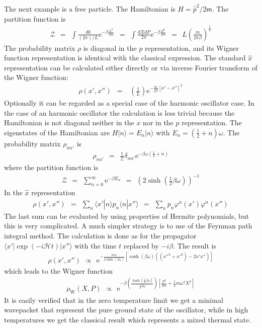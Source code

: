 \documentclass[onecolumn,fleqn, 11pt]{revtex4}
\newcommand{\eexp}{\mathrm{e}^}
\newcommand{\mass}{\mathsf{m}}
\newcommand{\tbox}[1]{\text{#1}}
\newcommand{\beq}{\begin{eqnarray}}
\newcommand{\eeq}{\end{eqnarray}}
\begin{document}
The next example is a free particle.
The Hamiltonian is $H = \hat{p}^2/2\mass$. 
The partition function is  
\beq
\mathcal{Z} 
\ \ = \ \ \int \frac{dk}{(2\pi)/L} \eexp{-\beta \frac{k^2}{2m}} 
\ \ = \ \ \int \frac{dXdP}{2 \pi} \eexp{-\beta \frac{P^2}{2m}} 
\ \ = \ \ L \left( \frac{m}{2 \pi \beta} \right)^{\frac{1}{2}} 
\eeq
The probability matrix  $\rho$ is diagonal in the $p$ 
representation, and its Wigner function representation 
is identical with the classical expression. 
The standard $\hat{x}$ representation can be calculated either 
directly or via inverse Fourier transform of the Wigner function:
\beq
\rho (x',x'') & = & \ \left( \frac{1}{L} \right)  \eexp{-\frac{m}{2 \beta }[x'-x'']^2}
\eeq
Optionally it can be regarded as a special case of 
the harmonic oscillator case. In the case of an 
harmonic oscillator the calculation is 
less trivial because the Hamiltonian is not diagonal neither 
in the $x$ nor in the $p$ representation. 
The eigenstates of the Hamiltonian are $H |n\rangle = E_n |n\rangle$ 
with $E_n = \left( \frac{1}{2} + n \right) \omega$. 
The probability matrix $\rho_{nn'}$ is 
\beq
\rho_{nn'} \ \ = \ \ \frac{1}{\mathcal{Z}} \delta_{nn'} 
\eexp{-\beta \omega \left( \frac{1}{2} + n \right) } \eeq
where the partition function is 
\beq
\mathcal{Z} \ \ = \ \ \sum_{n=0}^{\infty} \eexp{-\beta E_n} 
\ \ = \ \ \left( 2 \sinh \left( \frac{1}{2} \beta \omega \right) \right)^{-1}
\eeq
In the $\hat{x}$ representation
\beq
\rho (x',x'') 
\ \ = \ \ \sum_n \langle x' | n \rangle p_n \langle n | x'' \rangle  
\ \ = \ \ \sum_n p_n \varphi^ n (x')\varphi^ n (x'') 
\eeq
The last sum can be evaluated by using properties 
of Hermite polynomials, but this is very complicated. 
A much simpler strategy is to use of the Feynman path integral 
method. The calculation is done as for the 
propagator $\langle x' | \exp(-i\mathcal{H} t) | x'' \rangle$
with the time $t$ replaced by $-i\beta$.  
The result is  
\beq
\rho (x',x'')  \ \ \propto \ \   
\eexp{-\frac{m \omega}{2 \sinh (\beta \omega)} 
\left[ \cosh(\beta \omega) \left( ({x''}^2 + {x'}^2)  - 2 x' x'' \right)\right]}
\eeq
which leads to the Wigner function 
\beq
\rho_{\tbox{W}}(X,P)  \ \ \propto  \ \ \eexp{-\beta 
\left( \frac{\tanh \left( \frac{1}{2} \beta \omega \right)}{\frac{1}{2} \beta \omega} \right) 
\left[ \frac{P^2}{2m} + \frac{1}{2} m \omega^2 X^2 \right]}
\eeq
It is easily verified that in the zero temperature 
limit we get a minimal wavepacket that represent the 
pure ground state of the oscillator, while in high 
temperatures we get the classical result which represents 
a mixed thermal state.  
\end{document}
